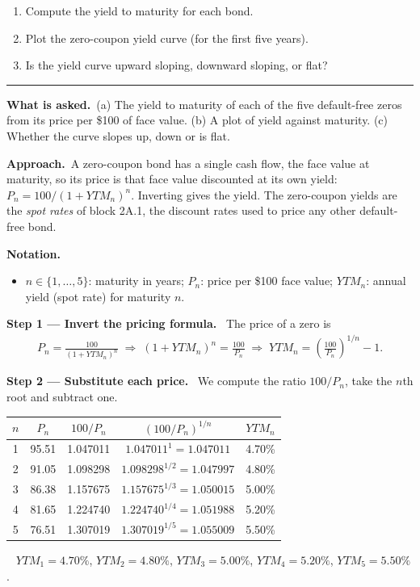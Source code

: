 \documentclass[11pt,a4paper]{article}
\newcommand{\notation}{\par\noindent\textbf{Notation.}}
\newcommand{\step}[2]{\par\medskip\noindent\textbf{Step #1 --- #2.}~}
\newcommand{\asked}{\par\medskip\noindent\textbf{What is asked.}~}
\newcommand{\approach}{\par\smallskip\noindent\textbf{Approach.}~}
\newcommand{\answer}[1]{\par\smallskip\noindent\fbox{\textbf{Answer #1.}}~}
\newcommand{\stmtend}{\par\endgroup\nopagebreak\noindent\rule{\linewidth}{0.4pt}\par\medskip}
\begin{document}
\begin{enumerate}
\def\labelenumi{\alph{enumi}.}
\item
  Compute the yield to maturity for each bond.
\item
  Plot the zero-coupon yield curve (for the first five years).
\item
  Is the yield curve upward sloping, downward sloping, or flat?
\end{enumerate}
\stmtend

\asked (a) The yield to maturity of each of the five default-free zeros from its price per \$100 of face value.
(b) A plot of yield against maturity. (c) Whether the curve slopes up, down or is flat.

\approach A zero-coupon bond has a single cash flow, the face value at maturity, so its price is that face
value discounted at its own yield: $P_n = 100/(1+YTM_n)^n$. Inverting gives the yield. The zero-coupon
yields are the \emph{spot rates} of block 2A.1, the discount rates used to price any other default-free bond.

\notation
\begin{itemize}
  \item $n\in\{1,\dots,5\}$: maturity in years; $P_n$: price per \$100 face value; $YTM_n$: annual yield (spot rate) for maturity $n$.
\end{itemize}

\step{1}{Invert the pricing formula} The price of a zero is
\begin{align}
  P_n = \frac{100}{(1+YTM_n)^n} \;\Longrightarrow\; (1+YTM_n)^n = \frac{100}{P_n} \;\Longrightarrow\; YTM_n = \left(\frac{100}{P_n}\right)^{1/n}-1. \label{r2be1-inv}
\end{align}

\step{2}{Substitute each price} We compute the ratio $100/P_n$, take the $n$th root and subtract one.
\begin{center}
\begin{tabular}{@{}cccc c@{}}\toprule
$n$ & $P_n$ & $100/P_n$ & $(100/P_n)^{1/n}$ & $YTM_n$\\\midrule
1 & 95.51 & 1.047011 & $1.047011^{1}=1.047011$ & 4.70\%\\
2 & 91.05 & 1.098298 & $1.098298^{1/2}=1.047997$ & 4.80\%\\
3 & 86.38 & 1.157675 & $1.157675^{1/3}=1.050015$ & 5.00\%\\
4 & 81.65 & 1.224740 & $1.224740^{1/4}=1.051988$ & 5.20\%\\
5 & 76.51 & 1.307019 & $1.307019^{1/5}=1.055009$ & 5.50\%\\\bottomrule
\end{tabular}
\end{center}
\answer{(a)} $YTM_1=4.70\%$, $YTM_2=4.80\%$, $YTM_3=5.00\%$, $YTM_4=5.20\%$, $YTM_5=5.50\%$.
\end{document}

